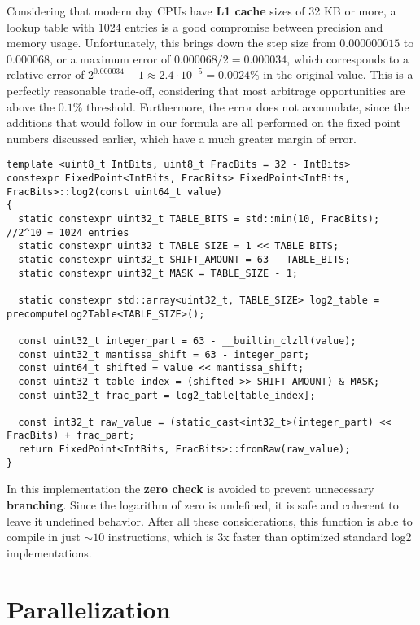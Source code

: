 \documentclass[11pt]{article}
\begin{document}
Considering that modern day CPUs have \textbf{L1 cache} sizes of 32 KB or more, a lookup table with 1024 entries is a good compromise between precision and memory usage. Unfortunately, this brings down the step size from $0.000000015$ to $0.000068$, or a maximum error of $0.000068 / 2 = 0.000034$, which corresponds to a relative error of $2^{0.000034} - 1 \approx 2.4 \cdot 10^{-5} = 0.0024\%$ in the original value. This is a perfectly reasonable trade-off, considering that most arbitrage opportunities are above the $0.1\%$ threshold. Furthermore, the error does not accumulate, since the additions that would follow in our formula are all performed on the fixed point numbers discussed earlier, which have a much greater margin of error.

\newpage
\begin{verbatim}
template <uint8_t IntBits, uint8_t FracBits = 32 - IntBits>
constexpr FixedPoint<IntBits, FracBits> FixedPoint<IntBits, FracBits>::log2(const uint64_t value)
{
  static constexpr uint32_t TABLE_BITS = std::min(10, FracBits); //2^10 = 1024 entries
  static constexpr uint32_t TABLE_SIZE = 1 << TABLE_BITS;
  static constexpr uint32_t SHIFT_AMOUNT = 63 - TABLE_BITS;
  static constexpr uint32_t MASK = TABLE_SIZE - 1;

  static constexpr std::array<uint32_t, TABLE_SIZE> log2_table = precomputeLog2Table<TABLE_SIZE>();

  const uint32_t integer_part = 63 - __builtin_clzll(value);
  const uint32_t mantissa_shift = 63 - integer_part;
  const uint64_t shifted = value << mantissa_shift;
  const uint32_t table_index = (shifted >> SHIFT_AMOUNT) & MASK;
  const uint32_t frac_part = log2_table[table_index];

  const int32_t raw_value = (static_cast<int32_t>(integer_part) << FracBits) + frac_part;
  return FixedPoint<IntBits, FracBits>::fromRaw(raw_value);
}
\end{verbatim}
In this implementation the \textbf{zero check} is avoided to prevent unnecessary \textbf{branching}. Since the logarithm of zero is undefined, it is safe and coherent to leave it undefined behavior. After all these considerations, this function is able to compile in just $\sim{10}$ instructions, which is 3x faster than optimized standard log2 implementations\textsuperscript{\cite{libc_log2}}.

\section{Parallelization}
\end{document}
